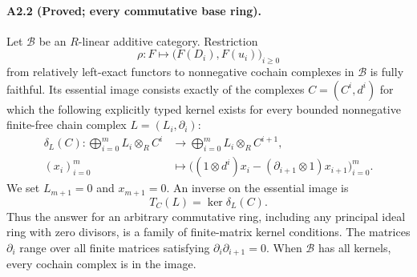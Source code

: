 \paragraph{A2.2 (Proved; every commutative base ring).}
\label{A2.2}
Let $\mathcal B$ be an $R$-linear additive category.  Restriction
\[
 \rho:F\longmapsto \bigl(F(D_i),F(u_i)\bigr)_{i\geq0}
\]
from relatively left-exact functors to nonnegative cochain complexes in
$\mathcal B$ is fully faithful.  Its essential image consists exactly
of the complexes $C=(C^i,d^i)$ for which the following explicitly typed
kernel exists for every bounded nonnegative finite-free chain complex
$L=(L_i,\partial_i)$:
\begin{align*}
 \delta_L(C):\bigoplus_{i=0}^{m}L_i\otimes_R C^i
   &\longrightarrow \bigoplus_{i=0}^{m}L_i\otimes_R C^{i+1},\\
 (x_i)_{i=0}^{m}&\longmapsto
 \bigl((1\otimes d^i)x_i-(\partial_{i+1}\otimes1)x_{i+1}\bigr)_{i=0}^{m}.
\end{align*}
We set $L_{m+1}=0$ and $x_{m+1}=0$.  An inverse on the essential image is
\[
 T_C(L)=\ker\delta_L(C).
\]
Thus the answer for an arbitrary commutative ring, including any
principal ideal ring with zero divisors, is a family of finite-matrix
kernel conditions.  The matrices $\partial_i$ range over all finite
matrices satisfying $\partial_i\partial_{i+1}=0$.  When $\mathcal B$
has all kernels, every cochain complex is in the image.

